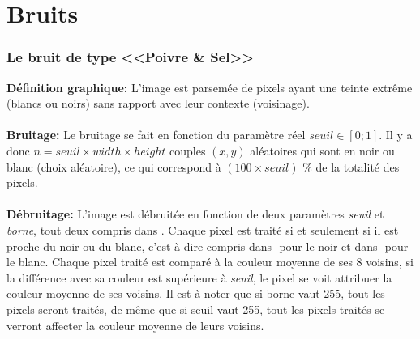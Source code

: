 \documentclass{article}
\begin{document}
	
	
	
	\newpage
	
	
	
	
	
	\part*{Bruits}
	
	
	
	
		\section{Le bruit de type <<Poivre \& Sel>>}
		\textbf{Définition graphique: }L'image est parsemée de pixels ayant une teinte extrême (blancs ou noirs) sans rapport avec leur contexte (voisinage).\\\\
		\textbf{Bruitage: }Le bruitage se fait en fonction du paramètre réel \begin{math}seuil\in[0;1]\end{math}. Il y a donc \begin{math}n = seuil\times width\times height\end{math} couples \begin{math}(x, y)\end{math} aléatoires qui sont en noir ou blanc (choix aléatoire), ce qui correspond à \begin{math}(100\times seuil)\end{math} \% de la totalité des pixels.\\\\
		\textbf{Débruitage: }L'image est débruitée en fonction de deux paramètres \emph{seuil} et \emph{borne}, tout deux compris dans \begin{math}[0;255]\end{math}. Chaque pixel est traité si et seulement si il est proche du noir ou du blanc, c'est-à-dire compris dans \begin{math}[0;borne]\end{math} pour le noir et dans \begin{math}[255-borne;255]\end{math} pour le blanc. Chaque pixel traité est comparé à la couleur moyenne de ses 8 voisins, si la différence avec sa couleur est supérieure à \emph{seuil}, le pixel se voit attribuer la couleur moyenne de ses voisins. Il est à noter que si borne vaut 255, tout les pixels seront traités, de même que si seuil vaut 255, tout les pixels traités se verront affecter la couleur moyenne de leurs voisins.\\\\
\end{document}
